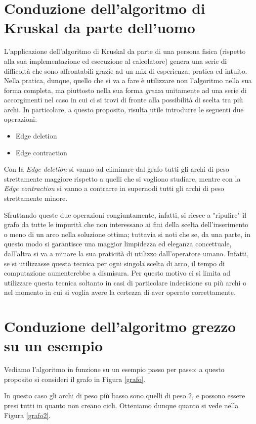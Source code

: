 \documentclass[12pt,a4paper,twoside]{article}
\theoremstyle{definition}
\theoremstyle{definition}
\theoremstyle{theorem}
\begin{document}
	\section{Conduzione dell'algoritmo di Kruskal da parte dell'uomo}
	L'applicazione dell'algoritmo di Kruskal da parte di una persona fisica (rispetto alla sua implementazione ed esecuzione al calcolatore) genera una serie di difficoltà che sono affrontabili grazie ad un mix di esperienza, pratica ed intuito. Nella pratica, dunque, quello che si va a fare è utilizzare non l'algoritmo nella sua forma completa, ma piuttosto nella sua forma \emph{grezza} unitamente ad una serie di accorgimenti nel caso in cui ci si trovi di fronte alla possibilità di scelta tra più archi. In particolare, a questo proposito, risulta utile introdurre le seguenti due operazioni:
	\begin{itemize}
		\item Edge deletion
		\item Edge contraction
	\end{itemize}
	Con la \emph{Edge deletion} si vanno ad eliminare dal grafo tutti gli archi di peso strettamente maggiore rispetto a quelli che si vogliono studiare, mentre con la \emph{Edge contraction} si vanno a contrarre in supernodi tutti gli archi di peso strettamente minore.
	
	Sfruttando queste due operazioni congiuntamente, infatti, si riesce a "ripulire" il grafo da tutte le impurità che non interessano ai fini della scelta dell'inserimento o meno di un arco nella soluzione ottima; tuttavia si noti che se, da una parte, in questo modo si garantisce una maggior limpidezza ed eleganza concettuale, dall'altra si va a minare la sua praticità di utilizzo dall'operatore umano. Infatti, se si utilizzasse questa tecnica per ogni singola scelta di arco, il tempo di computazione aumenterebbe a dismisura. Per questo motivo ci si limita ad utilizzare questa tecnica soltanto in casi di particolare indecisione su più archi o nel momento in cui si voglia avere la certezza di aver operato correttamente.
	
	
	\section{Conduzione dell'algoritmo grezzo su un esempio}
	Vediamo l'algoritmo in funzione su un esempio passo per passo: a questo proposito si consideri il  grafo in Figura \ref{grafo}.
			
	In questo caso gli archi di peso più basso sono quelli di peso 2, e possono essere presi tutti in quanto non creano cicli. Otteniamo dunque quanto si vede nella Figura \ref{grafo2}.
\end{document}

